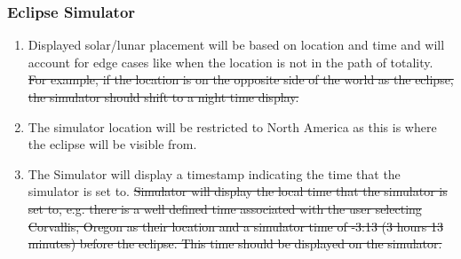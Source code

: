 \documentclass[10pt, onecolumn, draftclsnofoot, letterpaper, compsoc]{IEEEtran}
\begin{document}
\subsubsection{Eclipse Simulator}
	\begin{enumerate}
		\item Displayed solar/lunar placement will be based on location and
		time and will account for edge cases like when the location is not in
		the path of totality. \sout{For example, if the location is on the opposite
		side of the world as the eclipse, the simulator should shift to a night
		time display.}

		\item The simulator location will be restricted to North America as this is where
		the eclipse will be visible from.

		\item The Simulator will display a timestamp indicating the time that the simulator
		is set to.
		\sout{Simulator will display the local time that the simulator is set
		to, e.g. there is a well defined time associated with the user
		selecting Corvallis, Oregon as their location and a simulator time of
		-3:13 (3 hours 13 minutes) before the eclipse. This time should be
		displayed on the simulator.}
	\end{enumerate}
\end{document}
